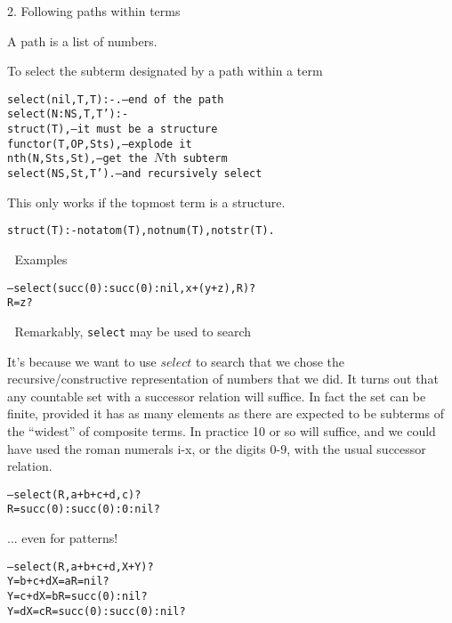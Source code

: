 \documentclass{popl}
\newenvironment{smalltt}{\begin{alltt}\smaller}{\end{alltt}}
\newcommand{\rmbox}[1]{\mbox{{\rm #1}}}
\begin{document}
\begin{foil} 
2. Following paths within terms

A path is a list of numbers.

To select the subterm designated by a path within a term
\begin{smalltt}
    select(nil,  T, T)  :- .    -- \rmbox{end of the path}
    select(N:NS, T, T') :-  
          struct(T),            -- \rmbox{it must be a structure}
          functor(T, OP, Sts),  -- \rmbox{explode it}
          nth(N, Sts, St),      -- \rmbox{get the \(N\)th subterm}
          select(NS, St, T').   -- \rmbox{and recursively select}
\end{smalltt}

This only works if the topmost term is a structure.
\begin{smalltt}
    struct(T) :- not atom(T), not num(T), not str(T).
\end{smalltt}

Examples
\begin{smalltt}
    -- select(succ(0):succ(0):nil, x+(y+z), R)?
    R = z ? 
\end{smalltt}

Remarkably, {\tt select} may be used to search
\begin{note}
It's because we want to use $select$ to search that we  chose the recursive/constructive 
representation of numbers that we did. It turns out that any countable set with a
successor relation will suffice. In fact the set can be finite, provided it has as many
elements as there are expected to be subterms of the ``widest'' of composite terms. 
In practice 10 or so will suffice, and we could have used the roman numerals i-x, or the digits 0-9,
with the usual successor relation.
\end{note}
\begin{smalltt}
    -- select(R, a+b+c+d, c)?
    R = succ(0) : succ(0) : 0 : nil ? 
\end{smalltt}

... even for patterns!
\begin{smalltt}
    -- select(R, a+b+c+d, X+Y)?
    Y = b + c + d X = a R = nil ? 
    Y = c + d X = b R = succ(0) : nil ? 
    Y = d X = c R = succ(0) : succ(0) : nil ? 
\end{smalltt}

\end{foil}
\end{document}
